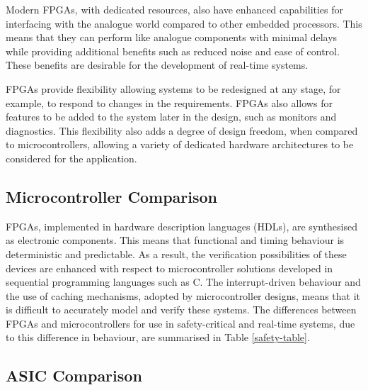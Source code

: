 Modern FPGAs, with dedicated resources, also have enhanced capabilities for interfacing with the analogue world compared to other embedded processors\cite{Rodriguez}. This means that they can perform like analogue components with minimal delays\cite{Aime} while providing additional benefits such as reduced noise and ease of control\cite{Naouar}. These benefits are desirable for the development of real-time systems.


FPGAs provide flexibility allowing systems to be redesigned at any stage\cite{Al-Dhaher}, for example, to respond to changes in the requirements\cite{Bernardeschi}. FPGAs also allows for features to be added to the system later in the design, such as monitors and diagnostics\cite{Jeppesen,MonmassonFPGABasedControllers}. This flexibility also adds a degree of design freedom, when compared to microcontrollers, allowing a variety of dedicated hardware architectures to be considered for the application\cite{Naouar, Idkhajine, Zhang}. 

\subsection{Microcontroller Comparison}

FPGAs, implemented in hardware description languages (HDLs), are synthesised as electronic components\cite{SalewskiSystematic}. This means that functional and timing behaviour is deterministic and predictable\cite{jabeen, wells}. As a result, the verification possibilities of these devices are enhanced\cite{HayekSafety, SalewskiExploring, SalewskiFaultHandling} with respect to microcontroller solutions developed in sequential programming languages such as C. The interrupt-driven behaviour and the use of caching mechanisms, adopted by microcontroller designs, means that it is difficult to accurately model and verify these systems\cite{wells, SalewskiExploring, SalewskiFaultHandling}. The differences between FPGAs and microcontrollers for use in safety-critical and real-time systems, due to this difference in behaviour, are summarised in Table \ref{safety-table}.




\subsection{ASIC Comparison}

